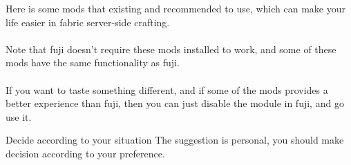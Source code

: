 \label{ch:suggestion}



Here is some mods that existing and recommended to use, which can make your life easier in fabric server-side crafting.\\
\\
Note that fuji doesn't require these mods installed to work, and some of these mods have the same functionality as fuji.\\
\\
If you want to taste something different, and if some of the mods provides a better experience than fuji, then you can just disable the module in fuji, and go use it.

\begin{tips}{Decide according to your situation}
    The suggestion is personal, you should make decision according to your preference.
\end{tips}

\clearpage


